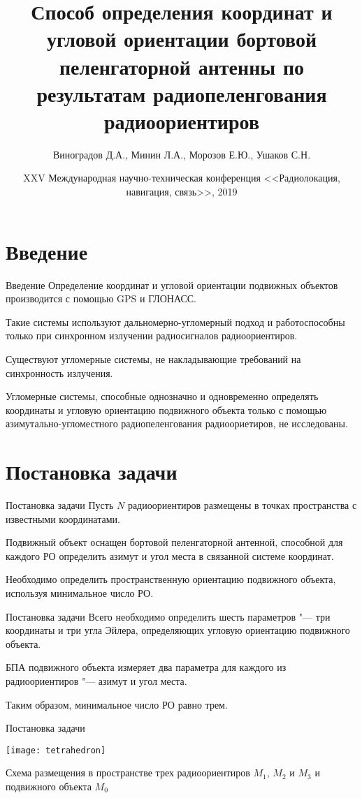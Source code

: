 \documentclass[russian,hyperref={unicode}]{beamer}
\title{Способ определения координат и угловой ориентации бортовой пеленгаторной антенны по результатам радиопеленгования радиоориентиров}
\institute
{
  \inst{1}%
  Военно-воздушная академия имени профессора Н.Е.Жуковского и Ю.А.Гагарина\\
  \inst{2}%
	Воронежский Государственный Университет
}
\author
{
  Виноградов Д.А.\inst{1}, Минин Л.А.\inst{2}, Морозов Е.Ю.\inst{2}, Ушаков С.Н\inst{2}.
}
\date[RLNC 2019]{XXV Международная научно-техническая конференция <<Радиолокация, навигация, связь>>, 2019}
\begin{document}
  \frame{\titlepage}

  \section{Введение}
  \begin{frame}{Введение}
    Определение координат и угловой ориентации подвижных объектов производится с
    помощью GPS и ГЛОНАСС.

    Такие системы используют дальномерно-угломерный подход и работоспособны только
    при синхронном излучении радиосигналов радиоориентиров.

    Существуют угломерные системы, не накладывающие требований на синхронность излучения.

    Угломерные системы, способные однозначно и одновременно определять координаты и
    угловую ориентацию подвижного объекта только с помощью азимутально-угломестного
    радиопеленгования радиоориетиров, не исследованы.
  \end{frame}

  \section{Постановка задачи}
  \begin{frame}{Постановка задачи}
      Пусть $N$ радиоориентиров размещены в точках пространства с известными координатами.

      Подвижный объект оснащен бортовой пеленгаторной антенной, способной для каждого
      РО определить азимут и угол места в связанной системе координат.

      Необходимо определить пространственную ориентацию подвижного объекта,
      используя минимальное число РО.
  \end{frame}

  \begin{frame}{Постановка задачи}
    Всего необходимо определить шесть параметров "--- три координаты и три угла Эйлера,
    определяющих угловую ориентацию подвижного объекта.

    БПА подвижного объекта измеряет два параметра для каждого из радиоориентиров "---
    азимут и угол места.

    Таким образом, минимальное число РО равно трем.
  \end{frame}

  \begin{frame}{Постановка задачи}
    \begin{center}
      \texttt{[image: tetrahedron]}

      Схема размещения в пространстве трех радиоориентиров $M_1$, $M_2$ и $M_3$ и подвижного объекта $M_0$
    \end{center}
  \end{frame}
\end{document}
